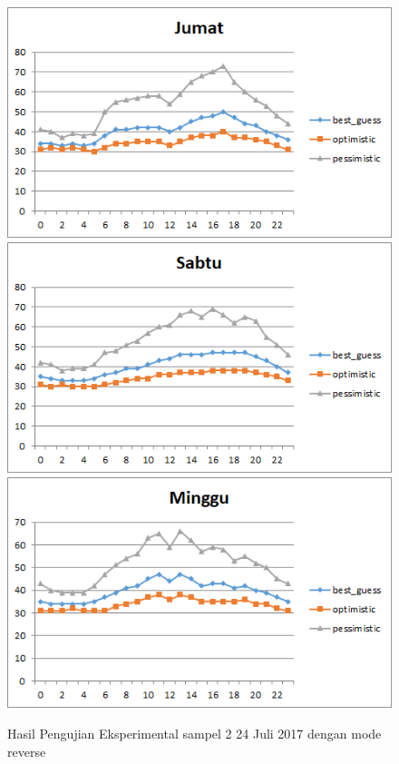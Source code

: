 \begin{figure}[H]
				\centering		
				\includegraphics[]{Gambar/jumatsampel224072017reverse.png}
				\includegraphics[]{Gambar/sabtusampel224072017reverse.png}
				\includegraphics[]{Gambar/minggusampel224072017reverse.png}
				\caption[Hasil Pengujian Eksperimental]{Hasil Pengujian Eksperimental sampel 2 24 Juli 2017 dengan mode reverse}
				\label{fig:eksperimentalsampel224072017reverse}
\end{figure}
